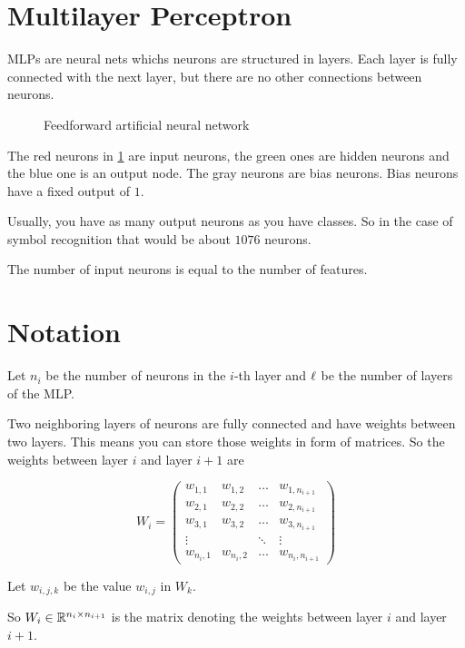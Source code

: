 \section{Multilayer Perceptron}\label{ch:Content2:sec:Section2}

\Glspl{MLP} are neural nets whichs neurons are structured in layers.
Each layer is fully connected with the next layer, but there are no other
connections between neurons.

\begin{figure}[ht]
    \centering
    
    \caption{Feedforward artificial neural network}
    \label{fig:feedforward}
\end{figure}

The red neurons in \cref{fig:feedforward} are input neurons, the green ones are
hidden neurons and the blue one is an output node. The gray neurons are bias neurons.
Bias neurons have a fixed output of $1$.

Usually, you have as many output neurons as you have classes. So in the case of
symbol recognition that would be about $\si{1076}$ neurons.

The number of input neurons is equal to the number of features.

\section{Notation}
Let $n_i$ be the number of neurons in the $i$-th layer and ${\ell}$ be the
number of layers of the \gls{MLP}.

Two neighboring layers of neurons are fully connected and have weights between
two layers. This means you can store those weights in form of matrices.
So the weights between layer $i$ and layer $i+1$ are

\[W_i = \begin{pmatrix}
    w_{1,1} & w_{1,2} & \dots & w_{1,n_{i+1}}\\
    w_{2,1} & w_{2,2} & \dots & w_{2,n_{i+1}}\\
    w_{3,1} & w_{3,2} & \dots & w_{3,n_{i+1}}\\
    \vdots  &         & \ddots& \vdots \\
    w_{n_{i},1} & w_{n_{i},2} & \dots & w_{n_{i},n_{i+1}}
\end{pmatrix}\]

Let $w_{i,j,k}$ be the value $w_{i,j}$ in $W_k$.

So $W_i \in \mathbb{R}^{n_i \times n_{i+1}}$ is the matrix denoting the weights between layer
$i$ and layer $i+1$.

